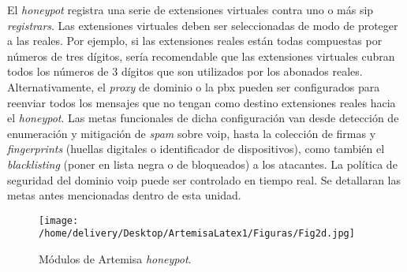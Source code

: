 \documentclass[a4paper,12pt]{report}
\begin{document}
El \emph{honeypot} registra una serie de extensiones virtuales contra uno o más \ac{sip}
\emph{registrars}. Las extensiones virtuales deben ser seleccionadas de modo de
proteger a las reales. Por ejemplo, si las extensiones reales están todas
compuestas por números de tres dígitos, sería recomendable que las extensiones
virtuales cubran todos los números de 3 dígitos que son utilizados por los
abonados reales. Alternativamente, el \emph{proxy} de dominio o la \ac{pbx} pueden ser
configurados para reenviar todos los mensajes que no tengan como destino
extensiones reales hacia el \emph{honeypot}. Las metas funcionales de dicha
configuración van desde detección de enumeración y mitigación de \emph{spam} sobre
\ac{voip}, hasta la colección de firmas y \emph{fingerprints} (huellas digitales o identificador
de dispositivos), como también el
\emph{blacklisting} (poner en lista negra o de bloqueados) a los atacantes. La
política de seguridad del dominio \ac{voip} puede ser controlado en tiempo real. Se
detallaran las metas antes mencionadas dentro de esta unidad. 

\begin{figure}[h!] 
\centering
\texttt{[image: /home/delivery/Desktop/ArtemisaLatex1/Figuras/Fig2d.jpg]}
\caption{Módulos de Artemisa \emph{honeypot}. \cite{docarmof}}
\label{modulos_artemisa}
\end{figure}
\end{document}
